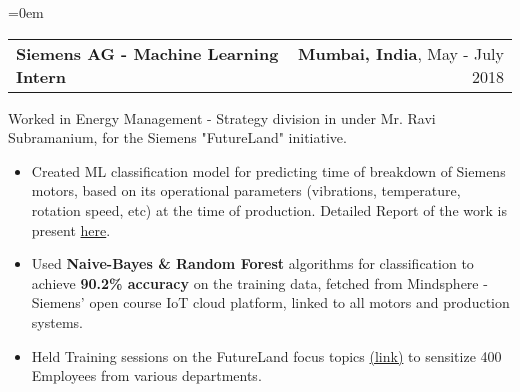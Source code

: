 \documentclass{article}
\makeatletter
\newcommand{\headerrow}[2]
{\begin{tabular*}{\linewidth}{l@{\extracolsep{\fill}}r}
	#1 &
	#2 \\
\end{tabular*}}
\makeatother
\begin{document}
\begin{list} {}{\leftmargin=0em}
    \item[]
    \headerrow {\textbf{Siemens AG - Machine Learning Intern}}{\textbf{Mumbai, India}, May - July 2018}
    Worked in Energy Management - Strategy division in under Mr. Ravi Subramanium, for the Siemens "FutureLand" initiative.
    \begin{itemize}
    \setlength\itemsep{0.0em}
        \item Created ML classification model for predicting time of breakdown of Siemens motors, based on its operational parameters (vibrations, temperature, rotation speed, etc) at the time of production. Detailed Report of the work is present \href{https://csciitd-my.sharepoint.com/:b:/g/personal/ee1170938_iitd_ac_in/EasUavDrTmdFrvuYc0rOissBVQwKuqxzharpOhXpblIN2Q?e=KJ8fPM}{here}.
        \item Used \textbf{Naive-Bayes \& Random Forest} algorithms for classification to achieve \textbf{90.2\% accuracy} on the training data, fetched from Mindsphere - Siemens' open course IoT cloud platform, linked to all motors and production systems.
        \item Held Training sessions on the FutureLand focus topics \href{https://www.siemens.com/global/en/home/company/fairs-events/futureland.html}{(link)} to sensitize 400 Employees from various departments.
    \end{itemize}
    

    

\end{list}
\end{document}
